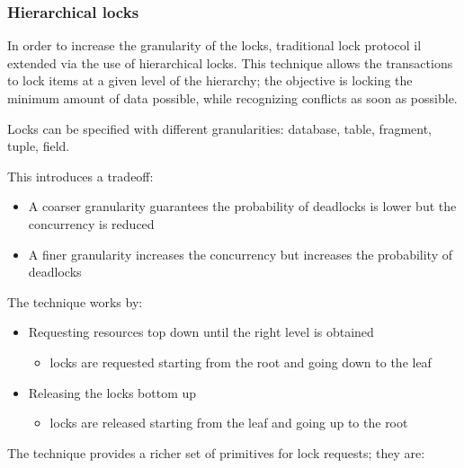 \documentclass[english]{article}
\begin{document}
\subsubsection{Hierarchical locks}

In order to increase the granularity of the locks, traditional lock protocol il extended via the use of hierarchical locks.
This technique allows the transactions to lock items at a given level of the hierarchy;
the objective is locking the minimum amount of data possible, while recognizing conflicts as soon as possible.

\begin{minipage}{0.8\textwidth}
  \bigskip
  Locks can be specified with different granularities: database, table, fragment, tuple, field.

  This introduces a tradeoff:
  \begin{itemize}
    \item A coarser granularity guarantees the probability of deadlocks is lower but the concurrency is reduced
    \item A finer granularity increases the concurrency but increases the probability of deadlocks
  \end{itemize}
  \bigskip
\end{minipage}
\begin{minipage}{0.195\textwidth}
  \bigskip
  \centering
  \bigskip
\end{minipage}

\bigskip
The technique works by:

\begin{itemize}
  \item Requesting resources top down until the right level is obtained
        \begin{itemize}[label=\(\downarrow\)]
          \item locks are requested starting from the root and going down to the leaf
        \end{itemize}
  \item Releasing the locks bottom up
        \begin{itemize}[label=\(\uparrow\)]
          \item locks are released starting from the leaf and going up to the root
        \end{itemize}
\end{itemize}

\bigskip
The technique provides a richer set of primitives for lock requests; they are:
\end{document}
